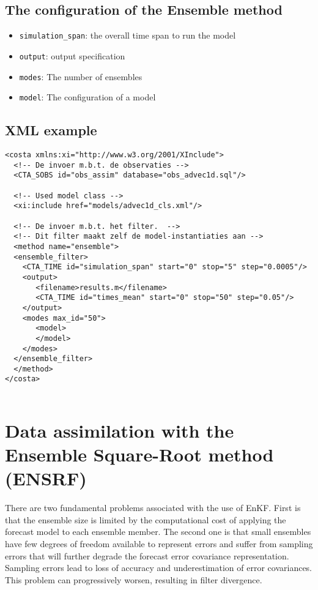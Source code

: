 \subsection{The configuration of the Ensemble method}
\begin{itemize}
\item {\tt simulation\_span}: the overall time span to run the model
\item {\tt output}: output specification
\item {\tt modes}: The number of ensembles
\item {\tt model}: The configuration of a model
\end{itemize}

\subsection{XML example}
\begin{verbatim}
<costa xmlns:xi="http://www.w3.org/2001/XInclude">
  <!-- De invoer m.b.t. de observaties -->
  <CTA_SOBS id="obs_assim" database="obs_advec1d.sql"/>

  <!-- Used model class -->
  <xi:include href="models/advec1d_cls.xml"/>

  <!-- De invoer m.b.t. het filter.  -->
  <!-- Dit filter maakt zelf de model-instantiaties aan -->
  <method name="ensemble"> 
  <ensemble_filter>
    <CTA_TIME id="simulation_span" start="0" stop="5" step="0.0005"/>
    <output>
       <filename>results.m</filename>
       <CTA_TIME id="times_mean" start="0" stop="50" step="0.05"/>
    </output>
    <modes max_id="50">
       <model>
       </model>
    </modes>
  </ensemble_filter>
  </method> 
</costa>


\end{verbatim}


\section{Data assimilation  with the Ensemble Square-Root method (ENSRF)}

There are two fundamental problems associated with the use of EnKF. First is
that the ensemble size is limited by the computational cost of applying the
forecast model to each ensemble member. The second one is that small ensembles
have few degrees of freedom available to represent errors and suffer from
sampling errors that will further degrade the forecast error covariance
representation. Sampling errors lead to loss of accuracy and underestimation of
error covariances. This problem can progressively worsen, resulting in filter
divergence.

